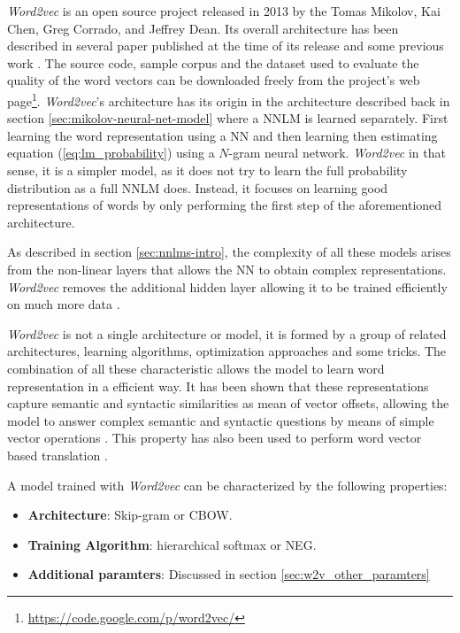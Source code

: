 \textit{Word2vec} is an open source project released in 2013 by the Tomas
Mikolov,  Kai Chen, Greg Corrado, and Jeffrey Dean.  
Its overall architecture has been described in several paper published at the
time of its release
\cite{DBLP:journals/corr/abs-1301-3781,MikolovSCCD13,conf/naacl/MikolovYZ13} 
and some previous work \cite{mikolovphd2012}. The source code, sample corpus
and the dataset used to evaluate the quality of the word vectors  can be downloaded freely from the project's
 web page\footnote{\url{https://code.google.com/p/word2vec/}}.
\textit{Word2vec}'s architecture
has its origin  in the architecture described back in section 
\ref{sec:mikolov-neural-net-model} where a \ac{NNLM} is learned separately. 
First learning the word representation using a \ac{NN} and then learning then
estimating equation (\ref{eq:lm_probability}) using a $N$-gram neural
network.  \textit{Word2vec} in that sense, it  is a simpler model, as it  does not
try to learn the full probability distribution as a full \ac{NNLM} does.
Instead, it  focuses on learning good representations of words by  only
performing  the first step  of the aforementioned architecture. %

As  described in section \ref{sec:nnlms-intro}, the complexity of all 
these models arises from the non-linear layers  that allows the \ac{NN} to
obtain complex representations.  \textit{Word2vec} removes the additional
hidden layer  allowing it to be trained efficiently on much more data  \cite{DBLP:journals/corr/abs-1301-3781}.

\textit{Word2vec} is not a single architecture or model, it is formed by a
group of related architectures, learning algorithms, optimization 
approaches and some tricks. The combination of all these characteristic
allows the model  to learn word representation in a efficient
way. It has been shown that these representations  capture semantic and
syntactic 
similarities as mean of vector offsets, allowing the model to answer complex
semantic and syntactic questions by means 
of simple vector operations   \cite{MikolovSCCD13}. This property  has also
been used to perform word vector based translation \cite{DBLP:journals/corr/MikolovLS13}.  

A model trained with \textit{Word2vec}  can be characterized by the following properties:


\begin{itemize}
\item \textbf{Architecture}: Skip-gram or \ac{CBOW}.
\item \textbf{Training Algorithm}: hierarchical softmax  or \ac{NEG}.
\item \textbf{Additional paramters}: Discussed in section \ref{sec:w2v_other_paramters}
\end{itemize}


